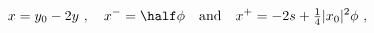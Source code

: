 \begin{equation*}
  x = y_0 - 2y~,\quad x^- = \half \phi \quad\text{and}\quad x^+ = -
  2 s + \tfrac14 |x_0|^2 \phi~,
\end{equation*}

